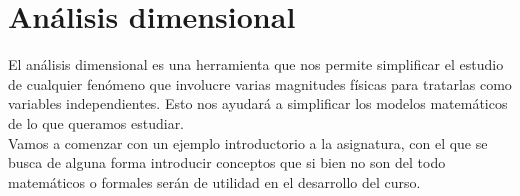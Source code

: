 
\chapter{An\'alisis dimensional}

El análisis dimensional es una herramienta que nos permite simplificar el estudio de cualquier fenómeno que involucre varias magnitudes físicas para tratarlas como variables independientes. Esto nos ayudará a simplificar los modelos matemáticos de lo que queramos estudiar.\\

Vamos a comenzar con un ejemplo introductorio a la asignatura, con el que se busca de alguna forma introducir conceptos que si bien no son del todo matemáticos o formales serán de utilidad en el desarrollo del curso.

